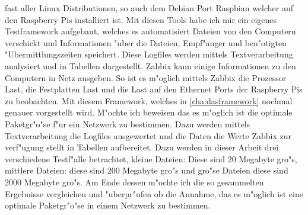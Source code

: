 fast aller Linux Distributionen, so auch dem Debian Port Raspbian welcher auf den %
Raspberry Pis installiert ist. Mit diesen Tools habe ich mir ein eigenes Testframework aufgebaut, %
welches es automatisiert Dateien von den Computern verschickt und Informationen "uber die Dateien, %
Empf"anger und ben"otigten "Ubermittlungszeiten speichert. Diese Logfiles werden %
mittels Textverarbeitung analysiert und in Tabellen dargestellt. Zabbix kann einige %
Informationen zu den Computern in Netz ausgeben. So ist es m"oglich mittels Zabbix die %
Prozessor Last, die Festplatten Last und die Last auf den Ethernet Ports der Raspberry Pis %
zu beobachten. Mit diesem Framework, welches in \cref{cha:dasframework} nochmal genauer vorgestellt wird. %
M"ochte ich beweisen das es m"oglich ist die optimale Paketgr"o"se f"ur ein Netzwerk zu bestimmen. %
Dazu werden mittels Textverarbeitung die Logfiles ausgewertet und die Daten die %
Werte Zabbix zur verf"ugung stellt in Tabellen aufbereitet. Dazu werden in dieser Arbeit %
drei verschiedene Testf"alle betrachtet, kleine Dateien: Diese sind 20 Megabyte gro"s, %
mittlere Dateien: diese sind 200 Megabyte gro"s und gro"se Dateien diese sind 2000 Megabyte %
gro"s. Am Ende dessen m"ochte ich die so gesammelten Ergebnisse vergleichen und "uberpr"ufen %
ob die Annahme, das es m"oglich ist eine optimale Paketgr"o"se in einem Netzwerk zu bestimmen. %
